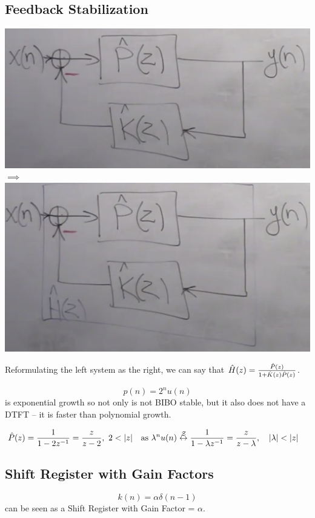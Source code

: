 \subsection{ Feedback Stabilization}
\includegraphics[scale=0.2]{lectures/wk12/img/system.png}
$\implies$
\includegraphics[scale=0.17]{lectures/wk12/img/system2.png}

Reformulating the left system as the right, we can say that $\hat{H}(z)=\frac{\hat P(z)}{1+\hat K(z)\hat P(z)}$.

\[
    p(n)=2^n u(n)
\]
is exponential growth so not only is not BIBO stable, but it also does not have a DTFT -- it is faster than polynomial growth.

\begin{align*}
    \hat P(z) 
    &=
    \frac1{1-2\zinv}=\frac{z}{z-2},\ 2<|z|
    &&\text{as }\lambda^n u(n)\zt \frac1{1-\lambda\zinv}=\frac{z}{z-\lambda},\quad|\lambda|<|z|
\end{align*}

\subsection{ Shift Register with Gain Factors}
\[
    k(n) = \alpha\delta(n-1)
\]
can be seen as a Shift Register with Gain Factor = $\alpha$.

